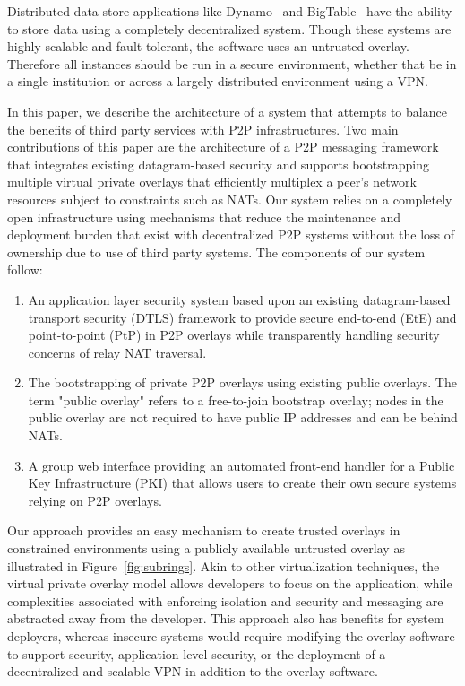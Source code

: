 \documentclass[conference]{IEEEtran}
\begin{document}
Distributed data store applications like Dynamo~\cite{dynamo} and
BigTable~\cite{bigtable} have the ability to store data using a completely
decentralized system.  Though these systems are highly scalable and fault
tolerant, the software uses an untrusted overlay.  Therefore all instances
should be run in a secure environment, whether that be in a single institution
or across a largely distributed environment using a VPN.

In this paper, we describe the architecture of a system that attempts
to balance the benefits of third party services with P2P infrastructures.
Two main contributions of this paper are the architecture of a P2P messaging
framework that integrates existing datagram-based security and supports
bootstrapping multiple virtual private overlays that efficiently multiplex a
peer's network resources subject to constraints such as NATs.
Our system relies on a completely open infrastructure using mechanisms that
reduce the maintenance and deployment burden that exist with decentralized
P2P systems without the loss of ownership due to use of third party systems.
The components of our system follow:
\begin{enumerate}
\setlength{\itemsep}{0pt}
\setlength{\parskip}{0pt}
\item An application layer security system based upon an existing datagram-based
transport security (DTLS) framework to provide secure end-to-end (EtE) and
point-to-point (PtP) in P2P overlays while transparently handling security
concerns of relay NAT traversal.
\item The bootstrapping of private P2P overlays using existing public overlays.
The term "public overlay" refers to a free-to-join bootstrap overlay; nodes in
the public overlay are not required to have public IP addresses and can be
behind NATs.
\item A group web interface providing an automated front-end handler for a 
Public Key Infrastructure (PKI) that allows users to create their own secure
systems relying on P2P overlays.
\end{enumerate}

Our approach provides an easy mechanism to create trusted overlays in
constrained environments using a publicly available untrusted overlay as
illustrated in Figure~\ref{fig:subrings}.  Akin to other virtualization
techniques, the virtual private overlay model allows developers to focus
on the application, while complexities associated with enforcing isolation
and security and messaging are abstracted away from the developer.
This approach also has benefits for system deployers, whereas insecure systems
would require modifying the overlay software to support security, application
level security, or the deployment of a decentralized and scalable VPN in
addition to the overlay software.
\end{document}
